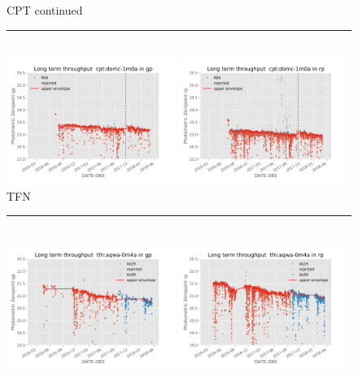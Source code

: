 \documentclass[draft]{spieman}
\begin{document}
\begin{figure}\ContinuedFloat
\centering
CPT continued \\ 
\rule{\textwidth}{0.4pt} \\
\includegraphics[width=0.49\textwidth]{images/photzptrend-cpt-domc-1m0a-gp.png} \hspace*{\fill} 
\includegraphics[width=0.49\textwidth]{images/photzptrend-cpt-domc-1m0a-rp.png} \\[1ex]
TFN \\ 
\rule{\textwidth}{0.4pt} \\
\includegraphics[width=0.49\textwidth]{images/photzptrend-tfn-aqwa-0m4a-gp.png} \hspace*{\fill}
\includegraphics[width=0.49\textwidth]{images/photzptrend-tfn-aqwa-0m4a-rp.png} \\

\end{figure}
\end{document}
